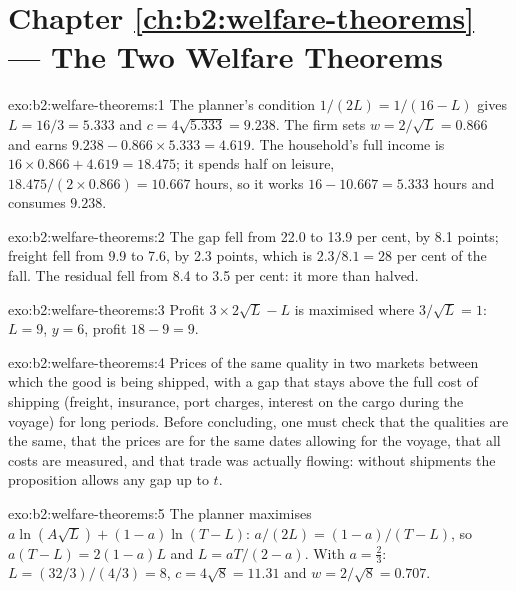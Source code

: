 \section*{Chapter \ref{ch:b2:welfare-theorems} --- The Two Welfare Theorems}

\begin{solution}{exo:b2:welfare-theorems:1}
The planner's condition $1/(2L) = 1/(16 - L)$ gives $L = 16/3 = 5.333$ and $c = 4\sqrt{5.333} = 9.238$.
The firm sets $w = 2/\sqrt L = 0.866$ and earns $9.238 - 0.866 \times 5.333 = 4.619$. The household's
full income is $16 \times 0.866 + 4.619 = 18.475$; it spends half on leisure, $18.475/(2 \times 0.866) =
10.667$ hours, so it works $16 - 10.667 = 5.333$ hours and consumes $9.238$.
\end{solution}

\begin{solution}{exo:b2:welfare-theorems:2}
The gap fell from 22.0 to 13.9 per cent, by 8.1 points; freight fell from 9.9 to 7.6, by 2.3 points, which
is $2.3/8.1 = 28$ per cent of the fall. The residual fell from 8.4 to 3.5 per cent: it more than halved.
\end{solution}

\begin{solution}{exo:b2:welfare-theorems:3}
Profit $3 \times 2\sqrt L - L$ is maximised where $3/\sqrt L = 1$: $L = 9$, $y = 6$, profit $18 - 9 = 9$.
\end{solution}

\begin{solution}{exo:b2:welfare-theorems:4}
Prices of the same quality in two markets between which the good is being shipped, with a gap that stays
above the full cost of shipping (freight, insurance, port charges, interest on the cargo during the
voyage) for long periods. Before concluding, one must check that the qualities are the same, that the
prices are for the same dates allowing for the voyage, that all costs are measured, and that trade was
actually flowing: without shipments the proposition allows any gap up to $t$.
\end{solution}

\begin{solution}{exo:b2:welfare-theorems:5}
The planner maximises $a\ln(A\sqrt L) + (1 - a)\ln(T - L)$: $a/(2L) = (1 - a)/(T - L)$, so $a(T - L) = 2(1
- a)L$ and $L = aT/(2 - a)$. With $a = \tfrac23$: $L = (32/3)/(4/3) = 8$, $c = 4\sqrt8 = 11.31$ and $w =
2/\sqrt8 = 0.707$.
\end{solution}

